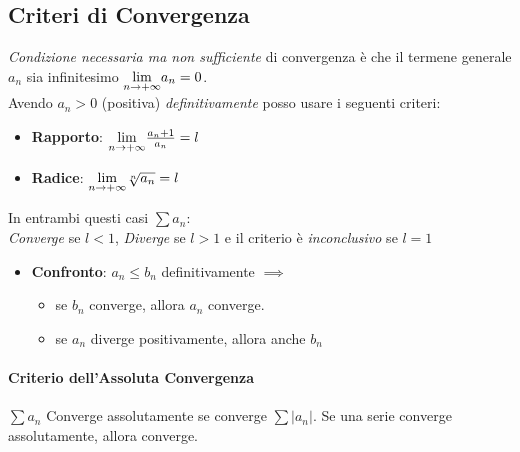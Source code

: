 \documentclass[12pt, a4paper]{article}
\begin{document}
\subsection*{Criteri di Convergenza}

\emph{Condizione necessaria ma non sufficiente} di convergenza è che il termene generale $a_n$ sia infinitesimo $\underset{n \to +\infty}{\lim} a_n = 0$.
\\Avendo $a_n>0$ (positiva) \emph{definitivamente} posso usare i seguenti criteri:
\begin{itemize}
	\item \textbf{Rapporto}: $\underset{n \to +\infty}{\lim} \frac{a_n+1}{a_n} = l$
	\item \textbf{Radice}: $\underset{n \to +\infty}{\lim} \sqrt[n]{a_n} = l$
\end{itemize}
In entrambi questi casi $\sum a_n$:\\
\emph{Converge} se $l<1$, \emph{Diverge} se $l>1$ e il criterio è \emph{inconclusivo} se $l=1$

\begin{itemize}
	\item \textbf{Confronto}: $a_n\leq b_n$ definitivamente $\implies$
	      \begin{itemize}
		      \item se $b_n$ converge, allora $a_n$ converge.
		      \item se $a_n$ diverge positivamente, allora anche $b_n$
	      \end{itemize}
\end{itemize}

\paragraph*{Criterio dell'Assoluta Convergenza}
$\sum a_n$ Converge assolutamente se converge $\sum |a_n|$.
Se una serie converge assolutamente, allora converge.
\end{document}
